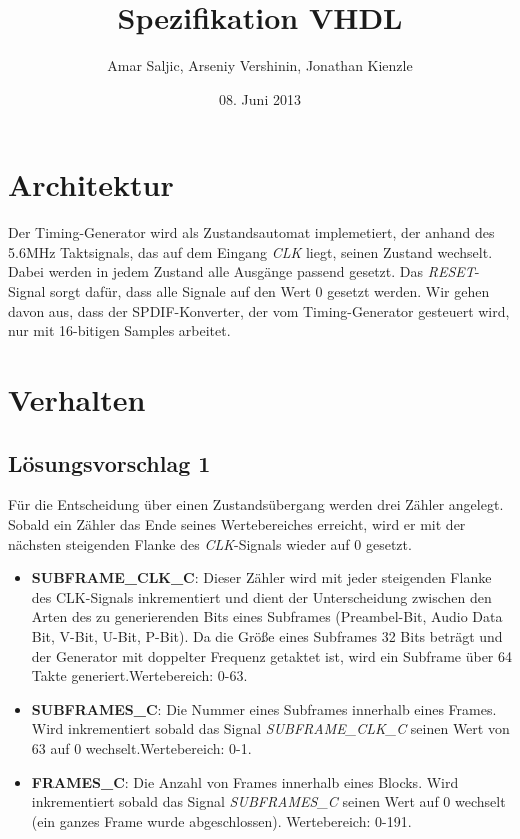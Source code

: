 \documentclass[12pt,a4paper]{article}
\title{Spezifikation VHDL}
\author{Amar Saljic, Arseniy Vershinin, Jonathan Kienzle}
\date{08. Juni 2013}
\begin{document}
\maketitle

\thispagestyle{fancy}

\section{Architektur}

Der Timing-Generator wird als Zustandsautomat implemetiert, der anhand des 5.6MHz Taktsignals, das auf dem Eingang \emph{CLK} liegt, seinen Zustand wechselt. Dabei werden in jedem Zustand alle Ausgänge passend gesetzt. Das \emph{RESET}-Signal sorgt dafür, dass alle Signale auf den Wert 0 gesetzt werden. Wir gehen davon aus, dass der SPDIF-Konverter, der vom Timing-Generator gesteuert wird, nur mit 16-bitigen Samples arbeitet.

\section{Verhalten}

\subsection{Lösungsvorschlag 1}

Für die Entscheidung über einen Zustandsübergang werden drei Zähler angelegt. Sobald ein Zähler das Ende seines Wertebereiches erreicht, wird er mit der nächsten steigenden Flanke des \emph{CLK}-Signals wieder auf 0 gesetzt.

\begin{itemize}
\item {\bf SUBFRAME\_CLK\_C}: Dieser Zähler wird mit jeder steigenden Flanke des CLK-Signals inkrementiert und dient der Unterscheidung zwischen den Arten des zu generierenden Bits eines Subframes (Preambel-Bit, Audio Data Bit, V-Bit, U-Bit, P-Bit). Da die Größe eines Subframes 32 Bits beträgt und der Generator mit doppelter Frequenz getaktet ist, wird ein Subframe über 64 Takte generiert.\newline Wertebereich: 0-63.
\item {\bf SUBFRAMES\_C}: Die Nummer eines Subframes innerhalb eines Frames. Wird inkrementiert sobald das Signal \emph{SUBFRAME\_CLK\_C} seinen Wert von 63 auf 0 wechselt.\newline Wertebereich: 0-1.
\item {\bf FRAMES\_C}: Die Anzahl von Frames innerhalb eines Blocks. Wird inkrementiert sobald das Signal \emph{SUBFRAMES\_C} seinen Wert auf 0 wechselt (ein ganzes Frame wurde abgeschlossen). \newline Wertebereich: 0-191. 
\end{itemize}
\end{document}
